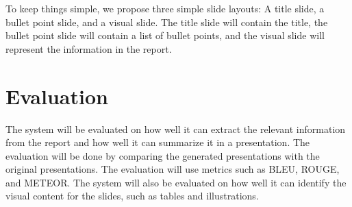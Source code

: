 To keep things simple, we propose three simple slide layouts: A title slide, a bullet point slide, and a visual slide. The title slide will contain the title, the bullet point slide will contain a list of bullet points, and the visual slide will represent the information in the report.

\section{Evaluation}
The system will be evaluated on how well it can extract the relevant information from the report and how well it can summarize it in a presentation. The evaluation will be done by comparing the generated presentations with the original presentations. The evaluation will use metrics such as BLEU, ROUGE, and METEOR. The system will also be evaluated on how well it can identify the visual content for the slides, such as tables and illustrations.

